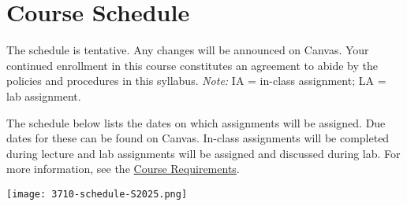 \documentclass[
  letterpaper,
]{article}
\begin{document}
\section{Course Schedule}\label{course-schedule}

The schedule is tentative. Any changes will be announced on Canvas. Your
continued enrollment in this course constitutes an agreement to abide by
the policies and procedures in this syllabus. \emph{Note:} IA = in-class
assignment; LA = lab assignment.

\begin{tcolorbox}[enhanced jigsaw, left=2mm, toptitle=1mm, opacitybacktitle=0.6, leftrule=.75mm, title=\textcolor{quarto-callout-note-color}{\faInfo}\hspace{0.5em}{Note}, colback=white, colframe=quarto-callout-note-color-frame, toprule=.15mm, rightrule=.15mm, coltitle=black, arc=.35mm, bottomtitle=1mm, colbacktitle=quarto-callout-note-color!10!white, breakable, bottomrule=.15mm, titlerule=0mm, opacityback=0]

The schedule below lists the dates on which assignments will be
assigned. Due dates for these can be found on Canvas. In-class
assignments will be completed during lecture and lab assignments will be
assigned and discussed during lab. For more information, see the
\hyperref[sec-requirements]{Course Requirements}.

\end{tcolorbox}

\texttt{[image: 3710-schedule-S2025.png]}
\end{document}
